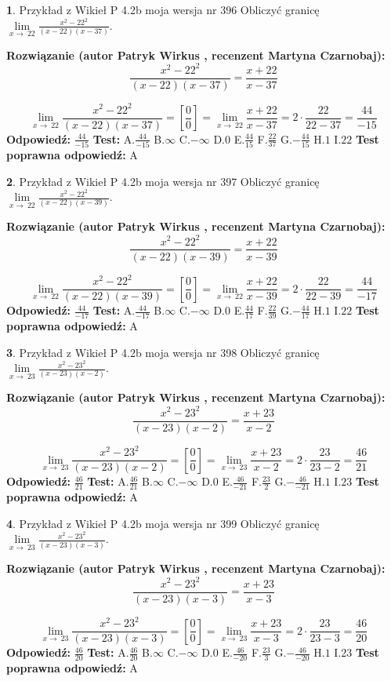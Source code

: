 \documentclass[12pt, a4paper]{article}
\theoremstyle{definition} %
\newtheorem{zad}{}
\newcommand{\zadStart}[1]{\begin{zad}#1\newline}
\newcommand{\zadStop}{\end{zad}}
\newcommand{\rozwStart}[2]{\noindent \textbf{Rozwiązanie (autor #1 , recenzent #2): }\newline}
\newcommand{\rozwStop}{\newline}
\newcommand{\odpStart}{\noindent \textbf{Odpowiedź:}\newline}
\newcommand{\odpStop}{\newline}
\newcommand{\testStart}{\noindent \textbf{Test:}\newline}
\newcommand{\testStop}{\newline}
\newcommand{\kluczStart}{\noindent \textbf{Test poprawna odpowiedź:}\newline}
\newcommand{\kluczStop}{\newline}
\begin{document}
\zadStart{Przykład z Wikieł P 4.2b moja wersja nr 396}
Obliczyć granicę $\lim\limits_{x\to\ 22}\frac{x^{2}-22^{2}}{(x-22)(x-37)}$.
\zadStop
\rozwStart{Patryk Wirkus}{Martyna Czarnobaj}
$$\frac{x^{2}-22^{2}}{(x-22)(x-37)}=\frac{x+22}{x-37}$$

$$\lim\limits_{x\to\ 22}\frac{x^{2}-22^{2}}{(x-22)(x-37)}=[\frac{0}{0}]=\lim\limits_{x\to\ 22}\frac{x+22}{x-37}=2 \cdot \frac{22}{22-37} = \frac{44}{-15}$$
\rozwStop
\odpStart
$\frac{44}{-15}$
\odpStop
\testStart
A.$\frac{44}{-15}$
B.$\infty$
C.$-\infty$
D.$0$
E.$\frac{44}{15}$
F.$\frac{22}{37}$
G.$-\frac{44}{15}$
H.$1$
I.$22$
\testStop
\kluczStart
A
\kluczStop



\zadStart{Przykład z Wikieł P 4.2b moja wersja nr 397}
Obliczyć granicę $\lim\limits_{x\to\ 22}\frac{x^{2}-22^{2}}{(x-22)(x-39)}$.
\zadStop
\rozwStart{Patryk Wirkus}{Martyna Czarnobaj}
$$\frac{x^{2}-22^{2}}{(x-22)(x-39)}=\frac{x+22}{x-39}$$

$$\lim\limits_{x\to\ 22}\frac{x^{2}-22^{2}}{(x-22)(x-39)}=[\frac{0}{0}]=\lim\limits_{x\to\ 22}\frac{x+22}{x-39}=2 \cdot \frac{22}{22-39} = \frac{44}{-17}$$
\rozwStop
\odpStart
$\frac{44}{-17}$
\odpStop
\testStart
A.$\frac{44}{-17}$
B.$\infty$
C.$-\infty$
D.$0$
E.$\frac{44}{17}$
F.$\frac{22}{39}$
G.$-\frac{44}{17}$
H.$1$
I.$22$
\testStop
\kluczStart
A
\kluczStop



\zadStart{Przykład z Wikieł P 4.2b moja wersja nr 398}
Obliczyć granicę $\lim\limits_{x\to\ 23}\frac{x^{2}-23^{2}}{(x-23)(x-2)}$.
\zadStop
\rozwStart{Patryk Wirkus}{Martyna Czarnobaj}
$$\frac{x^{2}-23^{2}}{(x-23)(x-2)}=\frac{x+23}{x-2}$$

$$\lim\limits_{x\to\ 23}\frac{x^{2}-23^{2}}{(x-23)(x-2)}=[\frac{0}{0}]=\lim\limits_{x\to\ 23}\frac{x+23}{x-2}=2 \cdot \frac{23}{23-2} = \frac{46}{21}$$
\rozwStop
\odpStart
$\frac{46}{21}$
\odpStop
\testStart
A.$\frac{46}{21}$
B.$\infty$
C.$-\infty$
D.$0$
E.$\frac{46}{-21}$
F.$\frac{23}{2}$
G.$-\frac{46}{-21}$
H.$1$
I.$23$
\testStop
\kluczStart
A
\kluczStop



\zadStart{Przykład z Wikieł P 4.2b moja wersja nr 399}
Obliczyć granicę $\lim\limits_{x\to\ 23}\frac{x^{2}-23^{2}}{(x-23)(x-3)}$.
\zadStop
\rozwStart{Patryk Wirkus}{Martyna Czarnobaj}
$$\frac{x^{2}-23^{2}}{(x-23)(x-3)}=\frac{x+23}{x-3}$$

$$\lim\limits_{x\to\ 23}\frac{x^{2}-23^{2}}{(x-23)(x-3)}=[\frac{0}{0}]=\lim\limits_{x\to\ 23}\frac{x+23}{x-3}=2 \cdot \frac{23}{23-3} = \frac{46}{20}$$
\rozwStop
\odpStart
$\frac{46}{20}$
\odpStop
\testStart
A.$\frac{46}{20}$
B.$\infty$
C.$-\infty$
D.$0$
E.$\frac{46}{-20}$
F.$\frac{23}{3}$
G.$-\frac{46}{-20}$
H.$1$
I.$23$
\testStop
\kluczStart
A
\kluczStop
\end{document}
